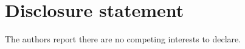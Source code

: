 \documentclass[preprint,review,11pt,authoryear]{elsarticle}
\begin{document}

\section*{Disclosure statement}
The authors report there are no competing interests to declare.





\end{document}
